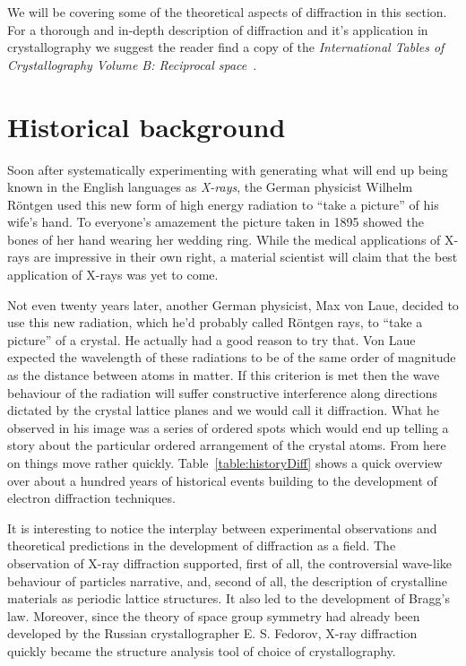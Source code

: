 We will be covering some of the theoretical aspects of diffraction in this section. For a thorough and in-depth description of diffraction and it's application in crystallography we suggest the reader find a copy of the \emph{International Tables of Crystallography Volume B: Reciprocal space}~\cite{IntTableCrysBX, IntTableCrysBe}. 


\section{Historical background}
\label{sec:history}
Soon after systematically experimenting with generating what will end up being known in the English languages as \textit{X-rays}, the German physicist Wilhelm R{\"o}ntgen used this new form of high energy radiation to ``take a picture'' of his wife’s hand. To everyone’s amazement the picture taken in 1895 showed the bones of her hand wearing her wedding ring. While the medical applications of X-rays are impressive in their own right, a material scientist will claim that the best application of X-rays was yet to come.

Not even twenty years later, another German physicist, Max von Laue, decided to use this new radiation, which he'd probably called R{\"o}ntgen rays,  to ``take a picture'' of a crystal. He actually had a good reason to try that. Von Laue expected the wavelength of these radiations to be of the same order of magnitude as the distance between atoms in matter. If this criterion is met then the wave behaviour of the radiation will suffer constructive interference along directions dictated by the crystal lattice planes and we would call it diffraction. What he observed in his image was a series of ordered spots which would end up telling a story about the particular ordered arrangement of the crystal atoms. From here on things move rather quickly. Table~\ref{table:historyDiff} shows a quick overview over about a hundred years of historical events building to the development of electron diffraction techniques.

It is interesting to notice the interplay between experimental observations and theoretical predictions in the development of diffraction as a field. The observation of X-ray diffraction supported, first of all, the controversial wave-like behaviour of particles narrative, and, second of all, the description of crystalline materials as periodic lattice structures. It also led to the development of Bragg's law. Moreover, since the theory of space group symmetry had already been developed by the Russian crystallographer E. S. Fedorov, X-ray diffraction quickly became the structure analysis tool of choice of crystallography.









